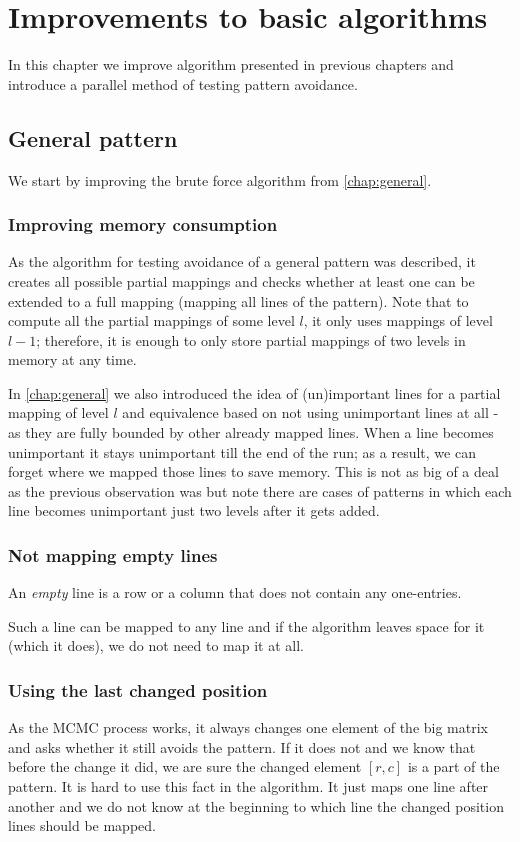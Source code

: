 \chapter{Improvements to basic algorithms}
\label{chap:imp}
In this chapter we improve algorithm presented in previous chapters and introduce a parallel method of testing pattern avoidance.

\section{General pattern}
We start by improving the brute force algorithm from \autoref{chap:general}.

\subsection{Improving memory consumption}
As the algorithm for testing avoidance of a general pattern was described, it creates all possible partial mappings and checks whether at least one can be extended to a full mapping (mapping all lines of the pattern). Note that to compute all the partial mappings of some level $l$, it only uses mappings of level $l-1$; therefore, it is enough to only store partial mappings of two levels in memory at any time.

In \autoref{chap:general} we also introduced the idea of (un)important lines for a partial mapping of level $l$ and equivalence based on not using unimportant lines at all - as they are fully bounded by other already mapped lines. When a line becomes unimportant it stays unimportant till the end of the run; as a result, we can forget where we mapped those lines to save memory. This is not as big of a deal as the previous observation was but note there are cases of patterns in which each line becomes unimportant just two levels after it gets added.

\subsection{Not mapping empty lines}
\begin{defn}
An \emph{empty} line is a row or a column that does not contain any one-entries.
\end{defn}
Such a line can be mapped to any line and if the algorithm leaves space for it (which it does), we do not need to map it at all.

\subsection{Using the last changed position}
As the MCMC process works, it always changes one element of the big matrix and asks whether it still avoids the pattern. If it does not and we know that before the change it did, we are sure the changed element $[r,c]$ is a part of the pattern. It is hard to use this fact in the algorithm. It just maps one line after another and we do not know at the beginning to which line the changed position lines should be mapped.

